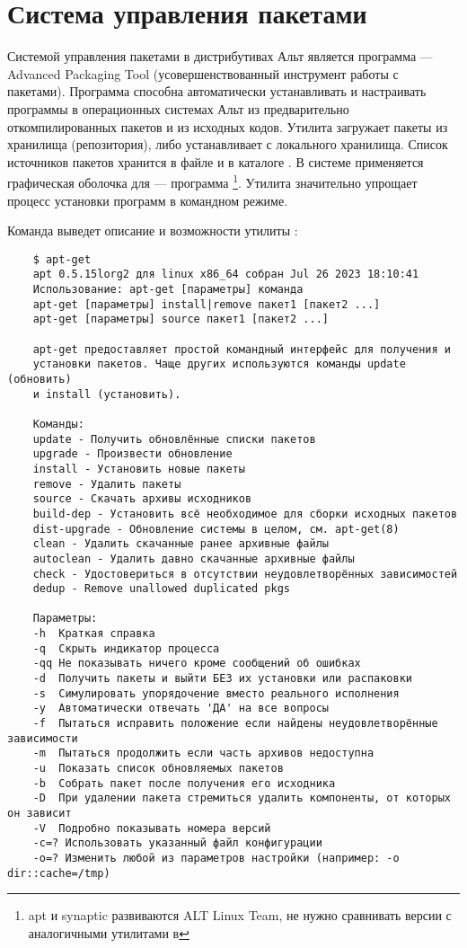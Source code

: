 \section{Система управления пакетами}
Системой управления пакетами в дистрибутивах Альт является программа  --- 
Advanced Packaging Tool (усовершенствованный инструмент работы с пакетами). Программа  
способна автоматически устанавливать и настраивать программы в операционных системах Альт из 
предварительно откомпилированных пакетов и из исходных кодов. Утилита загружает пакеты из хранилища 
(репозитория), либо устанавливает с локального хранилища. Список источников пакетов хранится в файле 
 и в каталоге . В системе  
применяется графическая оболочка для  --- программа \footnote{apt и synaptic 
развиваются ALT Linux Team, не нужно сравнивать версии с аналогичными утилитами в }. Утилита  
значительно упрощает процесс установки программ в командном режиме.

Команда  выведет описание и возможности утилиты :
\begin{verbatim}
	$ apt-get
	apt 0.5.15lorg2 для linux x86_64 собран Jul 26 2023 18:10:41
	Использование: apt-get [параметры] команда
	apt-get [параметры] install|remove пакет1 [пакет2 ...]
	apt-get [параметры] source пакет1 [пакет2 ...]
	
	apt-get предоставляет простой командный интерфейс для получения и
	установки пакетов. Чаще других используются команды update (обновить)
	и install (установить).
	
	Команды:
	update - Получить обновлённые списки пакетов
	upgrade - Произвести обновление
	install - Установить новые пакеты
	remove - Удалить пакеты
	source - Скачать архивы исходников
	build-dep - Установить всё необходимое для сборки исходных пакетов
	dist-upgrade - Обновление системы в целом, см. apt-get(8)
	clean - Удалить скачанные ранее архивные файлы
	autoclean - Удалить давно скачанные архивные файлы
	check - Удостовериться в отсутствии неудовлетворённых зависимостей
	dedup - Remove unallowed duplicated pkgs
	
	Параметры:
	-h  Краткая справка
	-q  Скрыть индикатор процесса
	-qq Не показывать ничего кроме сообщений об ошибках
	-d  Получить пакеты и выйти БЕЗ их установки или распаковки
	-s  Симулировать упорядочение вместо реального исполнения
	-y  Автоматически отвечать 'ДА' на все вопросы
	-f  Пытаться исправить положение если найдены неудовлетворённые зависимости
	-m  Пытаться продолжить если часть архивов недоступна
	-u  Показать список обновляемых пакетов
	-b  Собрать пакет после получения его исходника
	-D  При удалении пакета стремиться удалить компоненты, от которых он зависит
	-V  Подробно показывать номера версий
	-c=? Использовать указанный файл конфигурации
	-o=? Изменить любой из параметров настройки (например: -o dir::cache=/tmp)
\end{verbatim}

